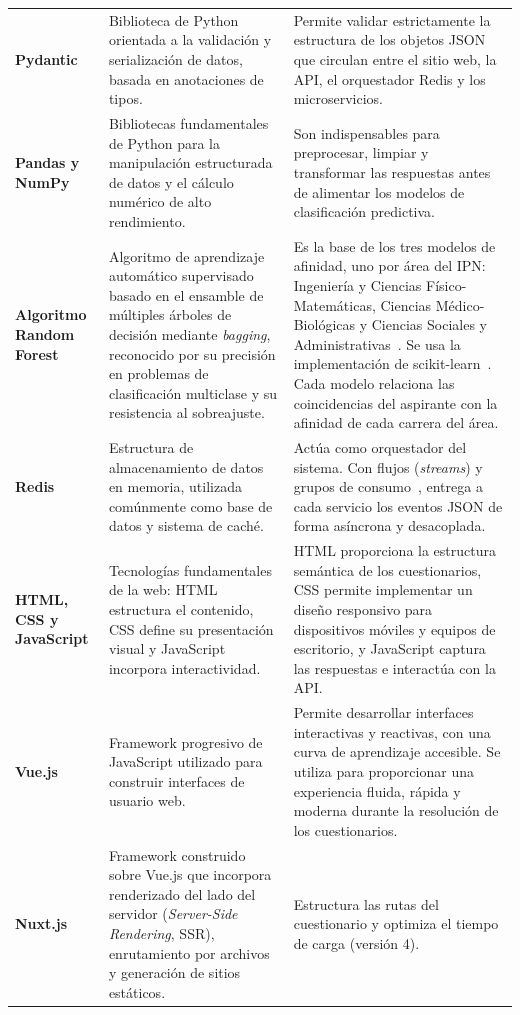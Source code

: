 \begin{longtable}{ L{0.17\textwidth} L{0.33\textwidth} L{0.42\textwidth} }
\textbf{Pydantic} & Biblioteca de Python orientada a la validación y serialización de datos, basada en anotaciones de tipos. & Permite validar estrictamente la estructura de los objetos JSON que circulan entre el sitio web, la API, el orquestador Redis y los microservicios. \\
\textbf{Pandas y NumPy} & Bibliotecas fundamentales de Python para la manipulación estructurada de datos y el cálculo numérico de alto rendimiento. & Son indispensables para preprocesar, limpiar y transformar las respuestas antes de alimentar los modelos de clasificación predictiva. \\
\textbf{Algoritmo Random Forest} & Algoritmo de aprendizaje automático supervisado basado en el ensamble de múltiples árboles de decisión mediante \textit{bagging}, reconocido por su precisión en problemas de clasificación multiclase y su resistencia al sobreajuste. & Es la base de los tres modelos de afinidad, uno por área del IPN: Ingeniería y Ciencias Físico-Matemáticas, Ciencias Médico-Biológicas y Ciencias Sociales y Administrativas~\cite{Breiman2001}. Se usa la implementación de scikit-learn~\cite{Pedregosa2011}. Cada modelo relaciona las coincidencias del aspirante con la afinidad de cada carrera del área. \\
\textbf{Redis} & Estructura de almacenamiento de datos en memoria, utilizada comúnmente como base de datos y sistema de caché. & Actúa como orquestador del sistema. Con flujos (\textit{streams}) y grupos de consumo~\cite{RedisStreams}, entrega a cada servicio los eventos JSON de forma asíncrona y desacoplada. \\
\textbf{HTML, CSS y JavaScript} & Tecnologías fundamentales de la web: HTML estructura el contenido, CSS define su presentación visual y JavaScript incorpora interactividad. & HTML proporciona la estructura semántica de los cuestionarios, CSS permite implementar un diseño responsivo para dispositivos móviles y equipos de escritorio, y JavaScript captura las respuestas e interactúa con la API. \\
\textbf{Vue.js} & Framework progresivo de JavaScript utilizado para construir interfaces de usuario web. & Permite desarrollar interfaces interactivas y reactivas, con una curva de aprendizaje accesible. Se utiliza para proporcionar una experiencia fluida, rápida y moderna durante la resolución de los cuestionarios. \\
\textbf{Nuxt.js} & Framework construido sobre Vue.js que incorpora renderizado del lado del servidor (\textit{Server-Side Rendering}, SSR), enrutamiento por archivos y generación de sitios estáticos. & Estructura las rutas del cuestionario y optimiza el tiempo de carga (versión 4). \\

\end{longtable}
